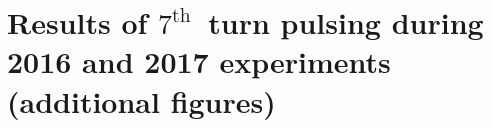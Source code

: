 \documentclass[%
 reprint,
 amsmath,amssymb,
 aps,
prstab,
]{revtex4-1}
\begin{document}
\section{Results of $7^{\mathrm{th}}$~turn pulsing during 2016 and 2017 experiments (additional figures)}
\label{app:sec:simexp:7}

\end{document}
